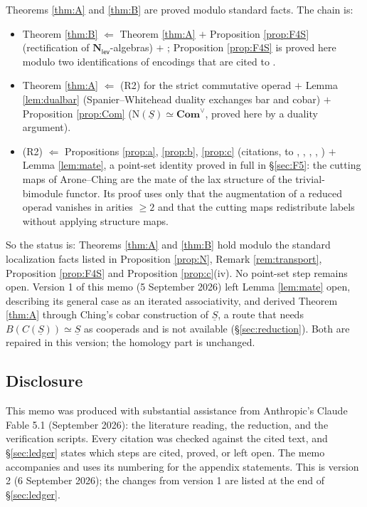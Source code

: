\documentclass[11pt]{amsart}
\theoremstyle{definition}
\theoremstyle{remark}
\newcommand{\Nl}{\mathbf{N}_{\mathsf{lev}}}
\newcommand{\uS}{\underline{S}}
\newcommand{\Comv}{\mathbf{Com}^{\vee}}
\newcommand{\Nfun}{\mathrm{N}}
\begin{document}
Theorems \ref{thm:A} and \ref{thm:B} are proved modulo standard facts. The chain is:
\begin{itemize}[leftmargin=2em]
\item Theorem \ref{thm:B} $\Leftarrow$ Theorem \ref{thm:A} $+$ Proposition \ref{prop:F4S} (rectification of $\Nl$-algebras) $+$ \cite[Theorem 1.3]{Cl2}; Proposition \ref{prop:F4S} is proved here modulo two identifications of encodings that are cited to \cite{CH20}.
\item Theorem \ref{thm:A} $\Leftarrow$ (R2) for the strict commutative operad $+$ Lemma \ref{lem:dualbar} (Spanier--Whitehead duality exchanges bar and cobar) $+$ Proposition \ref{prop:Com} ($\Nfun(\uS)\simeq\Comv$, proved here by a duality argument).
\item (R2) $\Leftarrow$ Propositions \ref{prop:a}, \ref{prop:b}, \ref{prop:c} (citations, to \cite{HA}, \cite{AC1}, \cite{PS18}, \cite{MG16}, \cite{HHLN}) $+$ Lemma \ref{lem:mate}, a point-set identity proved in full in \S\ref{sec:F5}: the cutting maps of Arone--Ching are the mate of the lax structure of the trivial-bimodule functor. Its proof uses only that the augmentation of a reduced operad vanishes in arities $\geq2$ and that the cutting maps redistribute labels without applying structure maps.
\end{itemize}
So the status is: Theorems \ref{thm:A} and \ref{thm:B} hold modulo the standard localization facts listed in Proposition \ref{prop:N}, Remark \ref{rem:transport}, Proposition \ref{prop:F4S} and Proposition \ref{prop:c}(iv). No point-set step remains open. Version 1 of this memo (5 September 2026) left Lemma \ref{lem:mate} open, describing its general case as an iterated associativity, and derived Theorem \ref{thm:A} through Ching's cobar construction of $\uS$, a route that needs $B(C(\uS))\simeq\uS$ as cooperads and is not available (\S\ref{sec:reduction}). Both are repaired in this version; the homology part is unchanged.

\subsection{Disclosure}
This memo was produced with substantial assistance from Anthropic's Claude Fable 5.1 (September 2026): the literature reading, the reduction, and the verification scripts. Every citation was checked against the cited text, and \S\ref{sec:ledger} states which steps are cited, proved, or left open. The memo accompanies \cite{Cl2} and uses its numbering for the appendix statements. This is version 2 (6 September 2026); the changes from version 1 are listed at the end of \S\ref{sec:ledger}.
\end{document}
